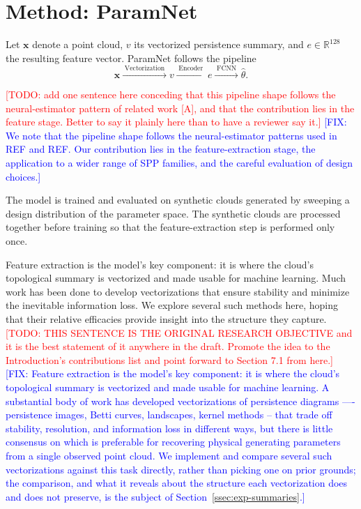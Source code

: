\documentclass[11pt,letterpaper]{article}
\newcommand{\R}{\mathbb{R}}
\newcommand{\1}{\mathds{1}}
\newcommand{\pc}{\mathbf{x}}
\newcommand{\todo}[1]{\textcolor{red}{[TODO: #1]}}
\newcommand{\fix}[1]{\textcolor{blue}{[FIX: #1]}}
\newcommand{\todo}[1]{}
\newcommand{\fix}[1]{}
\theoremstyle{plain}
\theoremstyle{definitioncolon}
\begin{document}
\section{Method: ParamNet}
\label{sec:method}

Let $\pc$ denote a point cloud, $v$ its vectorized persistence summary, and
$e \in \R^{128}$ the resulting feature vector. ParamNet follows the pipeline
    \begin{equation}
    \label{eq:pipeline}
    \pc \xrightarrow{\;\text{Vectorization}\;} v
    \xrightarrow{\;\text{Encoder}\;} e
    \xrightarrow{\;\text{FCNN}\;} \hat\theta.
    \end{equation}

\todo{add one sentence here conceding that this pipeline shape follows the
neural-estimator pattern of related work [A], and that the contribution lies in
the feature stage. Better to say it plainly here than to have a reviewer say it.}
\fix{We note that the pipeline shape follows the neural-estimator patterns used in REF
and REF. Our contribution lies in the feature-extraction stage, the application to
a wider range of SPP families, and the careful evaluation of design choices.}

The model is trained and evaluated on synthetic clouds generated by sweeping a
design distribution of the parameter space. The synthetic clouds are processed
together before training so that the feature-extraction step is performed only
once.

Feature extraction is the model's key component: it is where the cloud's
topological summary is vectorized and made usable for machine learning. Much
work has been done to develop vectorizations that ensure stability and minimize
the inevitable information loss. We explore several such methods here, hoping
that their relative efficacies provide insight into the structure they capture.
\todo{THIS SENTENCE IS THE ORIGINAL RESEARCH OBJECTIVE and it is the best
statement of it anywhere in the draft. Promote the idea to the Introduction's
contributions list and point forward to Section 7.1 from here.}
\fix{Feature extraction is the model's key component: it is where the cloud's 
topological summary is vectorized and made usable for machine learning. 
A substantial body of work has developed vectorizations of persistence 
diagrams —- persistence images, Betti curves, landscapes, kernel methods -- 
that trade off stability, resolution, and information loss in different ways, 
but there is little consensus on which is preferable for recovering physical 
generating parameters from a single observed point cloud. We implement and 
compare several such vectorizations against this task directly, rather than 
picking one on prior grounds; the comparison, and what it reveals about the 
structure each vectorization does and does not preserve, is the subject of 
Section~\ref{ssec:exp-summaries}.}
\end{document}
